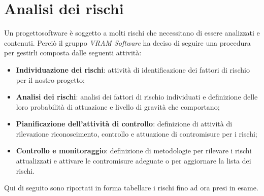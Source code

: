 \section{Analisi dei rischi}

Un progetto\glosp software è soggetto a molti rischi che necessitano di essere analizzati e contenuti. Perciò il gruppo \textit{VRAM Software} ha deciso di seguire una procedura per gestirli composta dalle seguenti attività:

\begin{itemize}
	\item \textbf{Individuazione dei rischi}: attività di identificazione dei fattori di rischio per il nostro progetto\glosp;
	\item \textbf{Analisi dei rischi}: analisi dei fattori di rischio individuati e definizione delle loro probabilità di attuazione e livello di gravità che comportano;
	\item \textbf{Pianificazione dell'attività di controllo}: definizione di attività di rilevazione riconoscimento, controllo e attuazione di contromisure per i rischi;
	\item \textbf{Controllo e monitoraggio}: definizione di metodologie per rilevare i rischi attualizzati e attivare le contromisure adeguate o per aggiornare la lista dei rischi.
\end{itemize}

Qui di seguito sono riportati in forma tabellare i rischi fino ad ora presi in esame.
